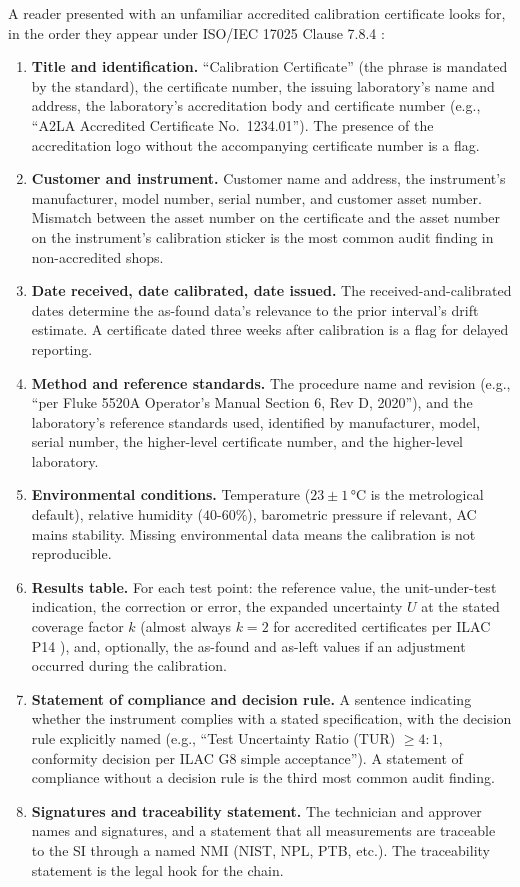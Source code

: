 A reader presented with an unfamiliar accredited calibration
certificate looks for, in the order they appear under
ISO/IEC 17025 Clause 7.8.4
\cite{std:ch03t3b-iso17025-clause7-8}:
\begin{enumerate}[leftmargin=*]
  \item \textbf{Title and identification.} ``Calibration
    Certificate'' (the phrase is mandated by the standard), the
    certificate number, the issuing laboratory's name and
    address, the laboratory's accreditation body and certificate
    number (e.g., ``A2LA Accredited Certificate No.\ 1234.01'').
    The presence of the accreditation logo without the
    accompanying certificate number is a flag.
  \item \textbf{Customer and instrument.} Customer name and
    address, the instrument's manufacturer, model number, serial
    number, and customer asset number. Mismatch between the
    asset number on the certificate and the asset number on the
    instrument's calibration sticker is the most common audit
    finding in non-accredited shops.
  \item \textbf{Date received, date calibrated, date issued.} The
    received-and-calibrated dates determine the as-found data's
    relevance to the prior interval's drift estimate. A
    certificate dated three weeks after calibration is a flag for
    delayed reporting.
  \item \textbf{Method and reference standards.} The procedure
    name and revision (e.g., ``per Fluke 5520A Operator's Manual
    Section 6, Rev D, 2020''), and the laboratory's reference
    standards used, identified by manufacturer, model, serial
    number, the higher-level certificate number, and the
    higher-level laboratory.
  \item \textbf{Environmental conditions.} Temperature ($23 \pm
    1\,\si{\degreeCelsius}$ is the metrological default),
    relative humidity ($40$-$60\%$), barometric pressure if
    relevant, AC mains stability. Missing environmental data
    means the calibration is not reproducible.
  \item \textbf{Results table.} For each test point: the
    reference value, the unit-under-test indication, the
    correction or error, the expanded uncertainty $U$ at the
    stated coverage factor $k$ (almost always $k = 2$ for
    accredited certificates per ILAC P14
    \cite{std:ch03t3b-ilac-p14}), and, optionally, the
    as-found and as-left values if an adjustment occurred during
    the calibration.
  \item \textbf{Statement of compliance and decision rule.} A
    sentence indicating whether the instrument complies with a
    stated specification, with the decision rule explicitly named
    (e.g., ``Test Uncertainty Ratio (TUR) $\geq 4{:}1$,
    conformity decision per ILAC G8 simple acceptance''). A
    statement of compliance without a decision rule is the third
    most common audit finding.
  \item \textbf{Signatures and traceability statement.} The
    technician and approver names and signatures, and a statement
    that all measurements are traceable to the SI through a named
    NMI (NIST, NPL, PTB, etc.). The traceability statement is the
    legal hook for the chain.
\end{enumerate}
